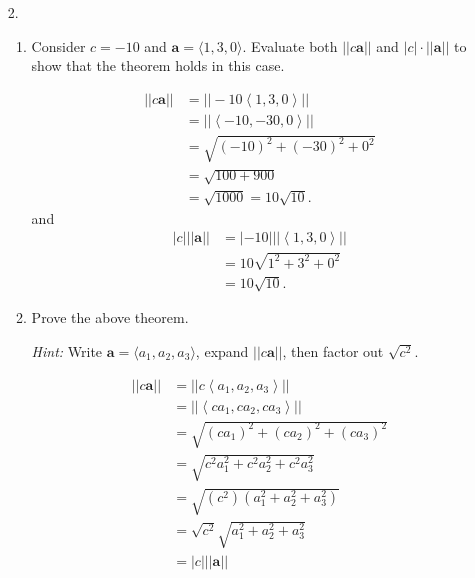 \documentclass[12pt]{exam}
\newcommand{\gen}[1]{\left\langle #1 \right\rangle}
\newcommand{\ba}{\bm{a}}
\begin{document}
  \begin{enumerate}
    \item[2.]{
      \begin{enumerate}
        \item{
          Consider $c=-10$ and $\mathbf{a}=\langle 1,3,0\rangle$.
          Evaluate both $||c\mathbf{a}||$ and $|c|\cdot||\mathbf{a}||$ to show that the theorem holds in this case.
        }
            \begin{solution}
                \begin{align*}
                    ||c\ba|| & = ||-10\gen{1,3,0}||\\
                        & = ||\gen{-10,-30,0}||\\
                        & = \sqrt{(-10)^2+(-30)^2+0^2}\\
                        & = \sqrt{100+900}\\
                        & = \sqrt{1000} = 10\sqrt{10}.
                \end{align*}
and
                \begin{align*}
                    |c| ||\ba|| & = |-10| ||\gen{1,3,0}||\\
                    & = 10\sqrt{1^2+3^2+0^2}\\
                    & = 10\sqrt{10}.
                \end{align*}
            \end{solution}
        \item{
          Prove the above theorem.
          
          \textit{Hint:}
          Write $\mathbf{a}=\langle a_{1},a_{2},a_{3}\rangle$, expand $||c\mathbf{a}||$, then factor out $\sqrt{c^{2}}$.
        }
            \begin{solution}
            \begin{align*}
                ||c\ba|| & = ||c\gen{a_1,a_2,a_3}||\\
                    & = ||\gen{ca_1,ca_2,ca_3}||\\
                    & = \sqrt{(ca_1)^2+(ca_2)^2+(ca_3)^2}\\
                    & = \sqrt{c^2a_1^2+c^2a_2^2+c^2a_3^2}\\
                    & = \sqrt{(c^2)(a_1^2+a_2^2+a_3^2)}\\
                    & = \sqrt{c^2}\sqrt{a_1^2+a_2^2+a_3^2}\\
                    & = |c| ||\ba||
            \end{align*}
            \end{solution}
      


      \end{enumerate}
    }
  \end{enumerate}
  
\end{document}
